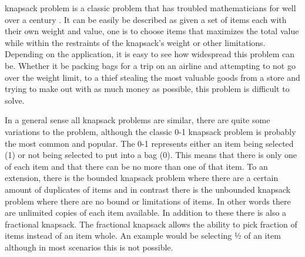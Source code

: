 \documentclass[10pt,journal,compsoc]{IEEEtran}
\begin{document}
% 
% 
% 
% 
 knapsack problem is a classic problem that has troubled
mathematicians for well over a century \cite{mathews_partition_1896}. It can
be easily be described as given a set of items each with their own weight and
value, one is to choose items that maximizes the total value while within the
restraints of the knapsack's weight or other limitations. Depending on the
application, it is easy to see how widespread this problem can be. Whether it be
packing bags for a trip on an airline and attempting to not go over the weight
limit, to a thief stealing the most valuable goods from a store and trying to
make out with as much money as possible, this problem is difficult to solve.

In a general sense all knapsack problems are similar, there are quite some
variations to the problem, although the classic 0-1 knapsack problem is probably
the most common and popular. The 0-1 represents either an item being selected
(1) or not being selected to put into a bag (0). This means that there is
only one of each item and that there can be no more than one of that item. To an
extension, there is the bounded knapsack problem where there are a certain
amount of duplicates of items and in contrast there is the unbounded knapsack
problem where there are no bound or limitations of items. In other words there
are unlimited copies of each item available. In addition to these there is also
a fractional knapsack. The fractional knapsack allows the ability to pick
fraction of items instead of an item whole. An example would be selecting ½ of
an item although in most scenarios this is not possible.
\end{document}
